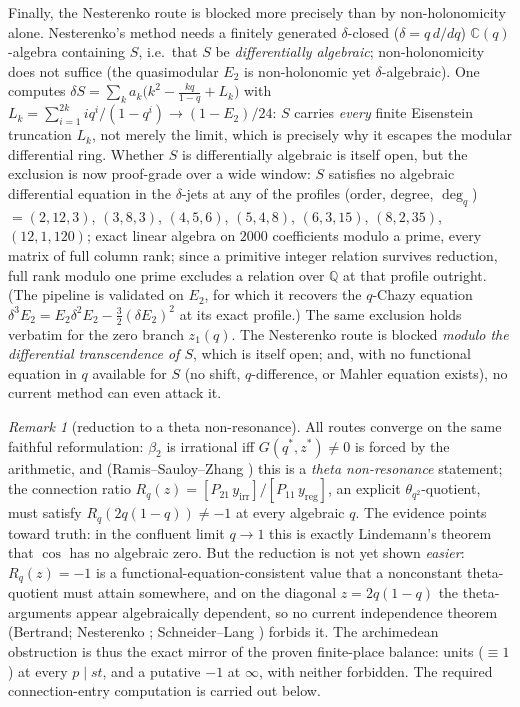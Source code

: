 \documentclass[11pt]{article}
\theoremstyle{plain}
\theoremstyle{definition}
\theoremstyle{remark}
\newtheorem{remark}[theorem]{Remark}
\newcommand{\Q}{\mathbb{Q}}
\newcommand{\C}{\mathbb{C}}
\begin{document}
Finally, the Nesterenko route is blocked more precisely than by non-holonomicity alone. Nesterenko's
method needs a finitely generated $\delta$-closed ($\delta=q\,d/dq$) $\C(q)$-algebra containing $S$,
i.e.\ that $S$ be \emph{differentially algebraic}; non-holonomicity does not suffice (the quasimodular
$E_2$ is non-holonomic yet $\delta$-algebraic). One computes
$\delta S=\sum_k a_k\bigl(k^2-\tfrac{kq}{1-q}+L_k\bigr)$ with
$L_k=\sum_{i=1}^{2k} iq^i/(1-q^i)\to(1-E_2)/24$: $S$ carries \emph{every} finite Eisenstein truncation
$L_k$, not merely the limit, which is precisely why it escapes the modular differential ring. Whether
$S$ is differentially algebraic is itself open, but the exclusion is now proof-grade over a wide
window: $S$ satisfies no algebraic differential equation in the $\delta$-jets at any of the
profiles (order, degree, $\deg_q$) $=(2,12,3)$, $(3,8,3)$, $(4,5,6)$, $(5,4,8)$, $(6,3,15)$,
$(8,2,35)$, $(12,1,120)$; exact linear algebra on $2000$ coefficients modulo a prime, every
matrix of full column rank; since a primitive integer relation survives reduction, full rank modulo
one prime excludes a relation over $\Q$ at that profile outright. (The pipeline is validated on
$E_2$, for which it recovers the $q$-Chazy equation
$\delta^3E_2=E_2\delta^2E_2-\tfrac32(\delta E_2)^2$ at its exact profile.) The same exclusion
holds verbatim for the zero branch $z_1(q)$. The Nesterenko route is blocked \emph{modulo the
differential transcendence of $S$}, which is itself open; and, with no functional equation in
$q$ available for $S$ (no shift, $q$-difference, or Mahler equation exists), no current method can
even attack it.

\begin{remark}[reduction to a theta non-resonance]
\label{rem:sharpest}
All routes converge on the same faithful reformulation: $\beta_2$ is irrational iff
$G(q^\ast,z^\ast)\ne0$ is forced by the arithmetic, and (Ramis--Sauloy--Zhang \cite{RSZ2013}) this is a
\emph{theta non-resonance} statement; the connection ratio $R_q(z)=[P_{21}\,y_{\mathrm{irr}}]/
[P_{11}\,y_{\mathrm{reg}}]$, an explicit $\theta_{q^2}$-quotient, must satisfy $R_q(2q(1-q))\ne-1$ at
every algebraic $q$. The evidence points toward truth: in the confluent limit $q\to1$ this is exactly
Lindemann's theorem that $\cos$ has no algebraic zero. But the reduction is not yet shown \emph{easier}:
$R_q(z)=-1$ is a functional-equation-consistent value that a nonconstant theta-quotient must attain
somewhere, and on the diagonal $z=2q(1-q)$ the theta-arguments appear algebraically dependent, so no
current independence theorem (Bertrand; Nesterenko \cite{Nesterenko1996}; Schneider--Lang
\cite{Lang1966}) forbids it. The archimedean
obstruction is thus the exact mirror of the proven finite-place balance: units ($\equiv1$) at every
$p\mid st$, and a putative $-1$ at $\infty$, with neither forbidden. The required connection-entry
computation is carried out below.
\end{remark}
\end{document}

